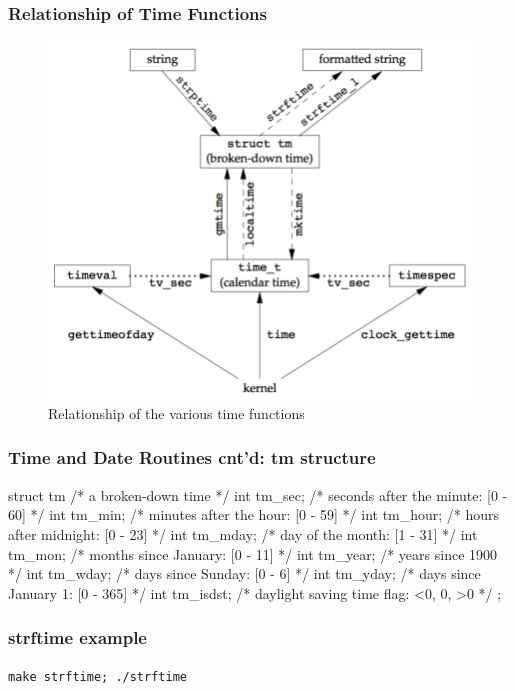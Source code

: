 \documentclass[newPxFont,sthlmFooter,nooffset]{beamer}
\begin{document}
\begin{frame}[t]
  \frametitle{Relationship of Time Functions}

\begin{figure}[h]
  \centering
  \includegraphics[height=0.8\textheight]{figure/fig6-9_relationship.png}
  \caption{Relationship of the various time functions}
\end{figure}
\end{frame}



\begin{frame}[containsverbatim,t]
  \frametitle{Time and Date Routines cnt'd: tm structure}

\begin{codedef}
struct tm {         /* a broken-down time */
     int  tm_sec;   /* seconds after the minute: [0 - 60] */
     int  tm_min;   /* minutes after the hour: [0 - 59] */
     int  tm_hour;  /* hours after midnight: [0 - 23] */
     int  tm_mday;  /* day of the month: [1 - 31] */
     int  tm_mon;   /* months since January: [0 - 11] */
     int  tm_year;  /* years since 1900 */
     int  tm_wday;  /* days since Sunday: [0 - 6] */
     int  tm_yday;  /* days since January 1: [0 - 365] */
     int  tm_isdst; /* daylight saving time flag: <0, 0, >0 */
};
\end{codedef}


\end{frame}

\begin{frame}[containsverbatim,t]
  \frametitle{strftime example}
\texttt{make strftime; ./strftime}



\end{frame}
\end{document}
